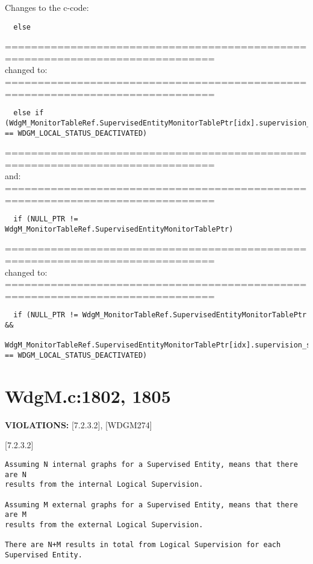 \documentclass[11pt,a4paper]{article}
\begin{document}
\lstset{language=c}

Changes to the c-code:
\begin{lstlisting}
  else
\end{lstlisting}
==============================================================================\\
changed to:\\
==============================================================================
\begin{lstlisting}
  else if (WdgM_MonitorTableRef.SupervisedEntityMonitorTablePtr[idx].supervision_status == WDGM_LOCAL_STATUS_DEACTIVATED)
\end{lstlisting}
==============================================================================\\
and:\\
==============================================================================
\begin{lstlisting}
  if (NULL_PTR != WdgM_MonitorTableRef.SupervisedEntityMonitorTablePtr)
\end{lstlisting}
==============================================================================\\
changed to:\\
==============================================================================
\begin{lstlisting}
  if (NULL_PTR != WdgM_MonitorTableRef.SupervisedEntityMonitorTablePtr &&
  WdgM_MonitorTableRef.SupervisedEntityMonitorTablePtr[idx].supervision_status == WDGM_LOCAL_STATUS_DEACTIVATED)
\end{lstlisting}
\newpage

\section{WdgM.c:1802, 1805}
\textbf{VIOLATIONS:} [7.2.3.2], [WDGM274]

\lstset{language=autosar}

[7.2.3.2]
\begin{lstlisting}
Assuming N internal graphs for a Supervised Entity, means that there are N
results from the internal Logical Supervision.

Assuming M external graphs for a Supervised Entity, means that there are M
results from the external Logical Supervision.

There are N+M results in total from Logical Supervision for each Supervised Entity.
\end{lstlisting}~\\
\end{document}
